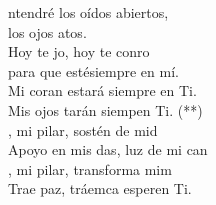 \begin{cancion}%
	ntendré los oídos abiertos,\\
	los ojos atos.\\
	Hoy te jo, hoy te conro\\
	para que estésiempre en mí.\\
	Mi coran estará siempre en Ti.\\
	Mis ojos tarán siempen Ti. (**)\\
	, mi pilar, sostén de mid\\
	Apoyo en mis das, luz de mi can\\
	, mi pilar, transforma mim\\
	Trae paz, tráemca esperen Ti.\\
\end{cancion}%
